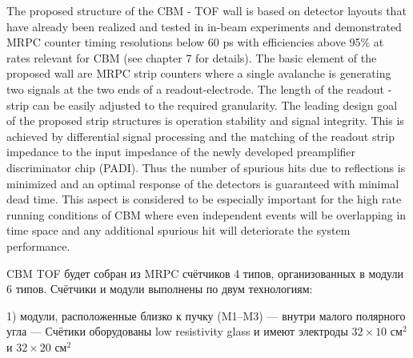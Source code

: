 The proposed structure of the CBM - TOF wall is based on detector layouts that have already been realized and tested in in-beam experiments and demonstrated MRPC counter timing resolutions below 60 ps with efficiencies above 95\% at rates relevant for CBM (see chapter 7 for details). The basic element of the proposed wall are MRPC strip counters where a single avalanche is generating two signals at the two ends of a readout-electrode. The length of the readout - strip can be easily adjusted to the required granularity. The leading design goal of the proposed strip structures is operation stability and signal integrity. This is achieved by differential signal processing and the matching of the readout strip impedance to the input impedance of the newly developed preamplifier discriminator chip (PADI). Thus the number of spurious hits due to reflections is minimized and an optimal response of the detectors is guaranteed with minimal dead time. This aspect is considered to be especially important for the high rate running conditions of CBM where even independent events will be overlapping in time space and any additional spurious hit will deteriorate the system performance.

CBM TOF будет собран из MRPC счётчиков 4 типов, организованных в модули 6 типов. Счётчики и модули выполнены по двум технологиям:



1) модули, расположенные близко к пучку (M1--M3) --- внутри малого полярного угла --- \todo
Счётики оборудованы low resistivity glass и имеют электроды $32 \times 10$ см$^2$ и $32 \times 20$ см$^2$



